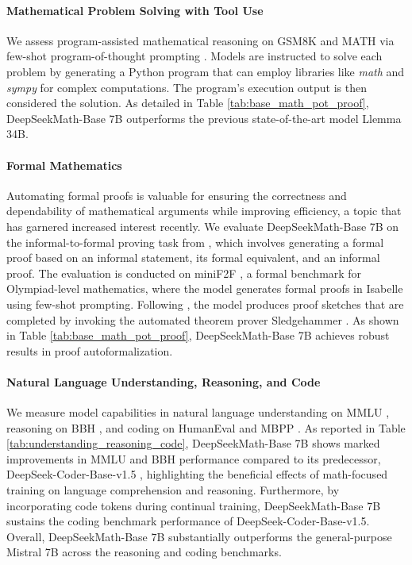 \paragraph{Mathematical Problem Solving with Tool Use} We assess program-assisted mathematical reasoning on GSM8K and MATH via few-shot program-of-thought prompting \citep{pot,pal}. Models are instructed to solve each problem by generating a Python program that can employ libraries like \textit{math} and \textit{sympy} for complex computations. The program’s execution output is then considered the solution. As detailed in Table \ref{tab:base_math_pot_proof}, DeepSeekMath-Base 7B outperforms the previous state-of-the-art model Llemma 34B.

\paragraph{Formal Mathematics}

Automating formal proofs is valuable for ensuring the correctness and dependability of mathematical arguments while improving efficiency, a topic that has garnered increased interest recently. We evaluate DeepSeekMath-Base 7B on the informal-to-formal proving task from \citep{dsp_proof}, which involves generating a formal proof based on an informal statement, its formal equivalent, and an informal proof. The evaluation is conducted on miniF2F \citep{minif2f}, a formal benchmark for Olympiad-level mathematics, where the model generates formal proofs in Isabelle using few-shot prompting. Following \cite{dsp_proof}, the model produces proof sketches that are completed by invoking the automated theorem prover Sledgehammer \citep{sledgehammer}. As shown in Table \ref{tab:base_math_pot_proof}, DeepSeekMath-Base 7B achieves robust results in proof autoformalization.

\paragraph{Natural Language Understanding, Reasoning, and Code}

We measure model capabilities in natural language understanding on MMLU \citep{mmlu}, reasoning on BBH \citep{bbh}, and coding on HumanEval \citep{codex} and MBPP \citep{mbpp}. As reported in Table \ref{tab:understanding_reasoning_code}, DeepSeekMath-Base 7B shows marked improvements in MMLU and BBH performance compared to its predecessor, DeepSeek-Coder-Base-v1.5 \citep{deepseek-coder}, highlighting the beneficial effects of math-focused training on language comprehension and reasoning. Furthermore, by incorporating code tokens during continual training, DeepSeekMath-Base 7B sustains the coding benchmark performance of DeepSeek-Coder-Base-v1.5. Overall, DeepSeekMath-Base 7B substantially outperforms the general-purpose Mistral 7B \citep{mistral} across the reasoning and coding benchmarks.


